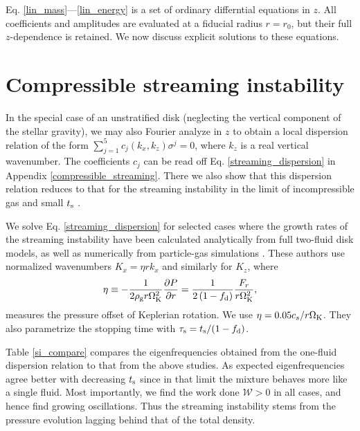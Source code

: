 
Eq. \ref{lin_mass}---\ref{lin_energy} is a set of ordinary
differntial equations in $z$. All coefficients and amplitudes are
evaluated at a fiducial radius $r=r_0$, but their full $z$-dependence
is retained. We now discuss explicit solutions to these equations. 

\section{Compressible streaming instability}\label{si}
In the special case of an unstratified disk (neglecting the vertical
component of the stellar gravity), we may also Fourier analyze in $z$
to obtain a local dispersion relation of the form  
$\sum_{j=1}^{5}c_j(k_x,k_z)\sigma^j = 0$, where $k_z$ is a real
vertical wavenumber. The coefficients $c_j$ can be read 
off Eq. \ref{streaming_dispersion} in  Appendix \ref{compressible_streaming}. 
There we also show that this dispersion relation reduces to that for
the streaming instability in the limit of incompressible gas and small
$t_\mathrm{s}$ \citep{youdin05a,jacquet11}.   

We solve Eq. \ref{streaming_dispersion} for selected cases where the  
growth rates of the streaming instability have been 
calculated analytically from full two-fluid disk models, as well as
numerically from particle-gas simulations 
\citep[namely][]{youdin07,bai10b}. These authors use normalized
wavenumbers $K_x = \eta r k_x$ and similarly for $K_z$, where
\begin{align} 
  \eta \equiv -\frac{1}{2\rho_\mathrm{g} r\Omega_{\rm K}^2}\frac{\partial P}{\partial r} = 
  \frac{1}{2\left(1-f_\mathrm{d}\right)}\frac{F_r}{r\Omega_{\rm K}^2}, 
\end{align} 
measures the pressure offset of Keplerian rotation. We use
$\eta=0.05c_s/r\Omega_{\rm K}$. They also parametrize the stopping time with
$\tau_\mathrm{s}=t_\mathrm{s}/(1-f_\mathrm{d})$. 
 
Table \ref{si_compare} compares the eigenfrequencies obtained from the
one-fluid dispersion relation to that from the above studies. As
expected eigenfrequencies agree better with decreasing $t_\mathrm{s}$ since
in that limit the mixture behaves more like a single fluid. Most
importantly, we find the work done $\mathcal{W}>0$ in all cases, and
hence find growing oscillations. Thus the streaming instability stems
from the pressure evolution lagging behind that of the total density.  

